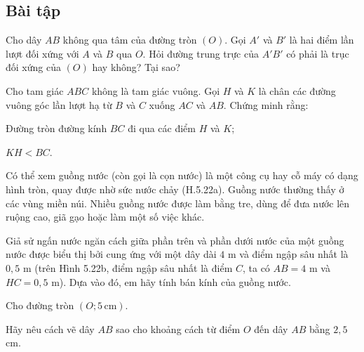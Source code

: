 \begin{exercises}
    \subsection{Bài tập}

    \begin{questions}[resume=SGK]
        \item Cho dây $AB$ không qua tâm của đường tròn $(O)$. Gọi $A'$ và $B'$ là hai điểm lần lượt đối xứng với $A$ và $B$ qua $O$. Hỏi đường trung trực của $A'B'$ có phải là trục đối xứng của $(O)$ hay không? Tại sao?

        \answerline
        \answerline

        \item Cho tam giác $ABC$ không là tam giác vuông. Gọi $H$ và $K$ là chân các đường vuông góc lần lượt hạ từ $B$ và $C$ xuống $AC$ và $AB$. Chứng minh rằng:
        \begin{questions}
            \item Đường tròn đường kính $BC$ đi qua các điểm $H$ và $K$;

            \answerline
            \answerline

            \item $KH<BC$.

            \answerline
            \answerline
        \end{questions}

        \item Có thể xem guồng nước (còn gọi là cọn nước) là một công cụ hay cỗ máy có dạng hình tròn, quay được nhờ sức nước chảy (H.5.22a). Guồng nước thường thấy ở các vùng miền núi. Nhiều guồng nước được làm bằng tre, dùng để đưa nước lên ruộng cao, giã gạo hoặc làm một số việc khác.

        Giả sử ngấn nước ngăn cách giữa phần trên và phần dưới nước của một guồng nước được biểu thị bởi cung ứng với một dây dài $4$ m và điểm ngập sâu nhất là $0,5$ m (trên Hình 5.22b, điểm ngập sâu nhất là điểm $C$, ta có $AB=4$ m và $HC=0,5$ m). Dựa vào đó, em hãy tính bán kính của guồng nước.


        \answerline
        \answerline
        \answerline

        \item Cho đường tròn $(O; 5\,\text{cm})$.
        \begin{questions}
            \item Hãy nêu cách vẽ dây $AB$ sao cho khoảng cách từ điểm $O$ đến dây $AB$ bằng $2,5$ cm.


\end{questions}
\end{questions}
\end{exercises}
